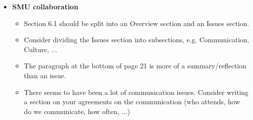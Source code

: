 \documentclass[../report.tex]{subfiles}
\begin{document}
\begin{itemize}
\item \textbf{SMU collaboration}
	\begin{itemize}
	\item Section 6.1 should be split into an Overview section and an Issues section.
	\item Consider dividing the Issues section into subsections, e.g. Communication, Culture, ...
	\item The paragraph at the bottom of page 21 is more of a summary/reflection than an issue.
	\item There seems to have been a lot of communication issues. Consider writing a section on your agreements on the communication (who attends, how do we communicate, how often, ...)
	\end{itemize}
\end{itemize}
\end{document}

